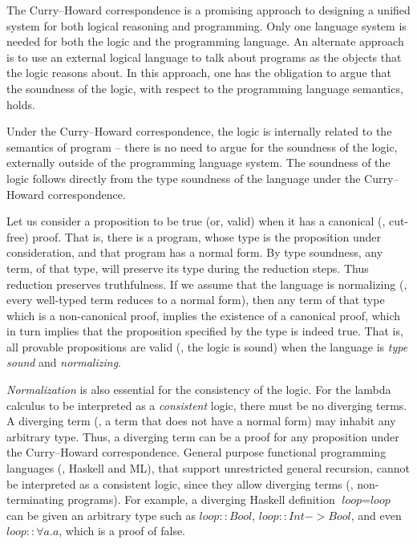 The Curry--Howard correspondence is a promising approach to designing a
unified system for both logical reasoning and programming. Only one language
system is needed for both the logic and the programming language. An
alternate approach is to use an external logical language to talk about
programs as the objects that the logic reasons about. In this approach, one
has the obligation to argue that the soundness of the logic, with respect to
the programming language semantics, holds.

Under the Curry--Howard correspondence, the logic is internally related to the
semantics of program -- there is no need to argue for the soundness of the
logic,  externally outside of the programming language system. The soundness
of the logic follows directly from the type soundness of the language under
the Curry--Howard correspondence.

Let us consider a proposition to be true
(or, valid) when it has a canonical (\ie, cut-free) proof.
That is, there is a program, whose type is the proposition under
consideration, and that program has a normal form. 
By type soundness, any term,
of that type, will preserve its type during the reduction steps. Thus
reduction preserves truthfulness. If we assume
that the language is normalizing (\ie, every well-typed term reduces to
a normal form), then any term of that type which is a non-canonical proof,
implies the existence of a canonical proof, which in turn implies that
the proposition specified by the type is indeed true. That is, all provable
propositions are valid (\ie, the logic is sound) when the language is
\emph{type sound} and \emph{normalizing}.

\emph{Normalization} is also essential for the consistency of the logic.
For the lambda calculus to be interpreted as a \emph{consistent} logic,
there must be no diverging terms. A diverging term (\ie, a term that does
not have a normal form) may inhabit any arbitrary type. Thus, a diverging term
can be a proof for any proposition under the Curry--Howard correspondence.
General purpose functional programming languages (\eg, Haskell and ML), that
support unrestricted general recursion, cannot be interpreted as a consistent
logic, since they allow diverging terms (\ie, non-terminating programs).
For example, a diverging Haskell definition $\textit{loop} = \textit{loop}$
can be given an arbitrary type such as
$\textit{loop}\mathrel{::}\textit{Bool}$,
$\textit{loop}\mathrel{::}\textit{Int} -> \textit{Bool}$,
and even $\textit{loop}\mathrel{::}\forall a. a$, which is a proof of false.


